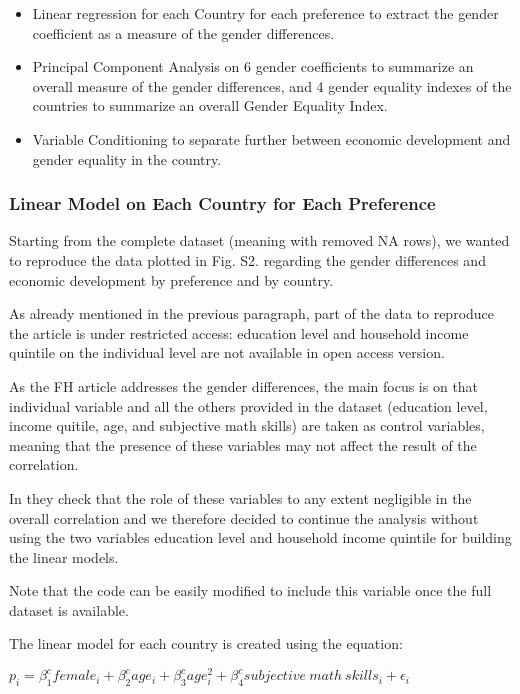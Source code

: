 \documentclass[
  11pt,
]{article}
\begin{document}
\begin{itemize}
\item
  Linear regression for each Country for each preference to extract the
  gender coefficient as a measure of the gender differences.
\item
  Principal Component Analysis on 6 gender coefficients to summarize an
  overall measure of the gender differences, and 4 gender equality
  indexes of the countries to summarize an overall Gender Equality
  Index.
\item
  Variable Conditioning to separate further between economic development
  and gender equality in the country.
\end{itemize}

\hypertarget{linear-model-on-each-country-for-each-preference}{%
\subsubsection{Linear Model on Each Country for Each
Preference}\label{linear-model-on-each-country-for-each-preference}}

Starting from the complete dataset (meaning with removed NA rows), we
wanted to reproduce the data plotted in Fig. S2. regarding the gender
differences and economic development by preference and by country.

As already mentioned in the previous paragraph, part of the data to
reproduce the article is under restricted access: education level and
household income quintile on the individual level are not available in
open access version.

As the FH article addresses the gender differences, the main focus is on
that individual variable and all the others provided in the dataset
(education level, income quitile, age, and subjective math skills) are
taken as control variables, meaning that the presence of these variables
may not affect the result of the correlation.

In \textcite{FH_SM} they check that the role of these variables to any
extent negligible in the overall correlation and we therefore decided to
continue the analysis without using the two variables education level
and household income quintile for building the linear models.

Note that the code can be easily modified to include this variable once
the full dataset is available.

The linear model for each country is created using the equation:

\(p_i = \beta_1^c female_i + \beta_2^c age_i + \beta_3^c age^2_i + \beta_4^c subjective \ math \ skills_i + \epsilon_i\)
\end{document}

